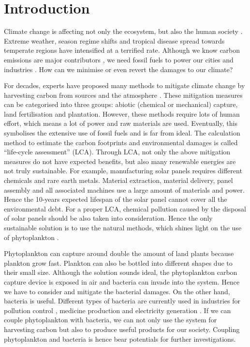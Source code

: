 \documentclass[../thesis.tex]{subfiles} %
\begin{document}
\section{Introduction}

Climate change is affecting not only the ecosystem, but also the human society \autocite{notz2016observed,schuur2015climate}.  Extreme weather, season regime shifts and tropical disease spread towards temperate regions have intensified at a terrified rate.  Although we know carbon emissions are major contributors \autocite{notz2016observed}, we need fossil fuels to power our cities and industries \autocite{ferguson2000electricity}.  How can we minimise or even revert the damages to our climate?

For decades, experts have proposed many methods to mitigate climate change by harvesting carbon from sources and the atmosphere \autocite{farrelly2013carbon,yang2008progress}.  These mitigation measures can be categorised into three groups: abiotic (chemical or mechanical) capture, land fertilisation and plantation.  However, these methods require lots of human effort, which means a lot of power and raw materials are used.  Eventually, this symbolises the extensive use of fossil fuels and is far from ideal.  The calculation method to estimate the carbon footprints and environmental damages is called ``life-cycle assessment” (LCA).  Through LCA, not only the above mitigation measures do not have expected benefits, but also many renewable energies are not truly sustainable.  For example, manufacturing solar panels requires different chemicals and rare earth metals.  Material extraction, material delivery, panel assembly and all associated machines use a large amount of materials and power.  Hence the 10-years expected lifespan of the solar panel cannot cover all the environmental debt.  For a proper LCA, chemical pollution caused by the disposal of solar panels should be also taken into consideration.  Hence the only sustainable solution is to use the natural methods, which shines light on the use of phytoplankton \autocite{farrelly2013carbon}.

Phytoplankton can capture around double the amount of land plants \autocite{SCHLESINGER2013341} because plankton grow fast.  Plankton can also be bottled into different shapes \autocite{evanson_2019} due to their small size.  Although the solution sounds ideal, the phytoplankton carbon capture device is exposed in air and bacteria can invade into the system.  Hence we have to consider and mitigate the bacterial damages.  On the other hand, bacteria is useful.  Different types of bacteria are currently used in industries for pollution control \autocite{dash2013marine,naik2013lead}, medicine production \autocite{huang2012industrial} and electricity generation \autocite{songera2012electricity}.  If we can couple phytoplankton with bacteria, we can not only use the system for harvesting carbon but also to produce useful products for our society.  Coupling phytoplankton and bacteria is hence bear potentials for further investigations.
\end{document}
